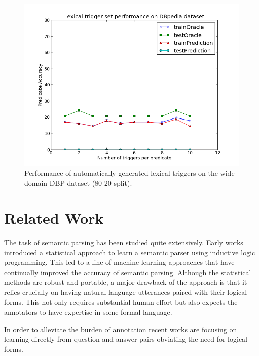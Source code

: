 \documentclass[11pt]{article}
\begin{document}
\begin{figure}[!htb]
\begin{center}
  \includegraphics[scale=0.45]{figs/ibPerf.png}
\caption{Performance of automatically generated lexical triggers on the wide-domain DBP dataset (80-20 split).}
\end{center}
\end{figure}

\section{Related Work}
The task of semantic parsing has been studied quite extensively. Early works \cite{ZM96} introduced a statistical approach to learn a semantic parser using inductive logic programming. This led to a line of machine learning approaches \cite{TM01, GeM05, KWM05, ZC07, WM06, KZGS10} that have continually improved the accuracy of semantic parsing.
Although the statistical methods are robust and portable, a major drawback of the approach is that it relies crucially on having natural language utterances paired with their logical forms. This not only requires substantial human effort but also expects the annotators to have expertise in some formal language.

In order to alleviate the burden of annotation recent works \cite{CGRR11, CGCR10, PD09, LJK11, AZ11} %
are focusing on learning directly from question and answer pairs obviating the need for logical forms.
\end{document}
